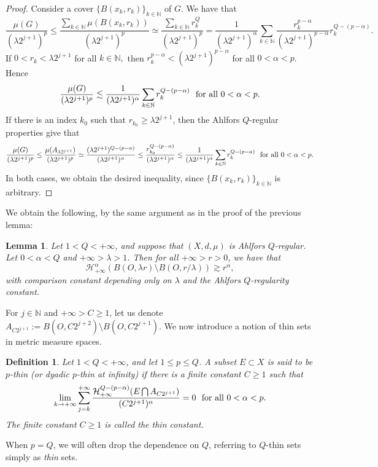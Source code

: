 \documentclass[10pt]{amsart}
\newtheorem{lemma}[theorem]{Lemma}
\newtheorem{definition}[theorem]{Definition}
\numberwithin{equation}{section}
\newcommand{\N}{\mathbb{N}}
\newcommand{\Ha}{\mathcal{H}}
\begin{document}
  \begin{proof}
    Consider a cover $\{B(x_k,r_k)\}_{k\in\mathbb N}$ of $G$.  We have that
		\[
		\frac{\mu(G)}{(\lambda 2^{j+1})^p}\leq \frac{\sum_{k\in\mathbb N} \mu(B(x_k,r_k))}{(\lambda 2^{j+1})^p}  \simeq \frac{\sum_{k\in\mathbb N} r_k^Q}{(\lambda 2^{j+1})^p}  = \frac{1}{(\lambda 2^{j+1})^\alpha} \sum_{k\in\mathbb N} \frac{r_k^{p-\alpha}}{(\lambda 2^{j+1})^{p-\alpha}} r_k^{Q-(p-\alpha)}.
		\]
		If $0<r_k<\lambda 2^{j+1}$ for all $k\in\mathbb N,$ then $r_k^{p-\alpha}< (\lambda 2^{j+1})^{p-\alpha}$ for all $0<\alpha<p$. Hence 
		\[
		\frac{\mu(G)}{(\lambda 2^{j+1})^p} \lesssim \frac{1}{(\lambda 2^{j+1})^\alpha} \sum_{k\in\mathbb N} r_k^{Q-(p-\alpha)} \text{\rm \ \ for all } 0<\alpha<p.
		\]
		If there is an index $k_0$ such that  $r_{k_0}\ge \lambda 2^{j+1}$, then  the Ahlfors $Q$-regular properties give that
		\[
		\frac{\mu(G)}{(\lambda 2^{j+1})^p} \leq \frac{\mu(A_{\lambda 2^{j+1}})}{(\lambda 2^{j+1})^p}\simeq\frac{(\lambda 2^{j+1})^{Q-(p-\alpha)}}{(\lambda 2^{j+1})^\alpha} \le\frac{r_{k_0}^{Q-(p-\alpha)}}{(\lambda 2^{j+1})^\alpha}\leq\frac{1}{ (\lambda 2^{j+1})^\alpha}\sum_{k\in\mathbb N}r_k^{Q-(p-\alpha)}\text{\rm \ \ for all } 0<\alpha<p.
        \]
		In both cases, we obtain the desired inequality, since $\{B(x_k,r_k)\}_{k\in\N}$ is arbitrary. 
  \end{proof}
We obtain the following, by the same argument as in the proof of the previous lemma:
\begin{lemma}\label{lem:Radius-Content}
Let $1<Q<+\infty$, and suppose that $(X,d,\mu)$ is Ahlfors $Q$-regular.  Let $0<\alpha<Q$ and $+\infty>\lambda>1$.  Then for all $+\infty>r>0$, we have that 
\[
\Ha^\alpha_{+\infty}(B(O,\lambda r)\setminus B(O,r/\lambda))\gtrsim r^\alpha,
\]
with comparison constant depending only on $\lambda$ and the Ahlfors $Q$-regularity constant.
\end{lemma}

  For $j\in\N$ and $+\infty>C\ge 1$, let us denote $A_{C 2^{j+1}}:=B(O,C2^{j+2})\setminus B(O,C2^{j+1})$. 
	 We now introduce a notion of thin sets in metric measure spaces. 
	 \begin{definition}\label{def-thin-0905} Let $1<Q<{+\infty}$, and let $1\le p\le Q$.
 A subset $E\subset X$ is said to be \emph{$p$-thin} (or \emph{dyadic $p$-thin at infinity}) if there is a finite constant $C\geq 1$ such that
 	\begin{equation}\label{eq2.4-2805}
		\lim_{k\to{+\infty}}\sum_{j=k}^{+\infty} \frac{\mathcal H^{Q-(p-\alpha)}_{+\infty}(E\bigcap A_{C 2^{j+1}})}{(C 2^{j+1})^\alpha}=0 \text{\rm \ \ for\ all\ $0<\alpha<p$}.
	 \end{equation}
  The finite constant $C\geq 1$ is called the thin constant.  
\end{definition}
When $p=Q$, we will often drop the dependence on $Q$, referring to $Q$-thin sets simply as \emph{thin} sets.
\end{document}
